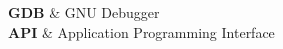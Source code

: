 \documentclass[legalpaper, 11pt, oneside]{Thesis}  %
\begin{document}


\lstlistoflistings

\clearpage  %
{
\textbf{GDB} & GNU Debugger \\
\textbf{API} & Application Programming Interface \\
}

\clearpage  %
\iffalse
{

}

\clearpage  %
\lhead{\emph{Symbols}}  %
\listofnomenclature{lll}  %
{
}
\fi


\end{document}
